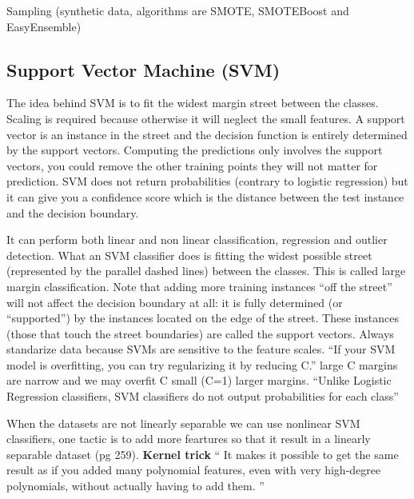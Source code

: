 \documentclass[11pt]{article}
\begin{document}
Sampling (synthetic data, algorithms are SMOTE, SMOTEBoost and EasyEnsemble)



\subsection{Support Vector Machine (SVM)}
%

The idea behind SVM is to fit the widest margin street between the classes. Scaling is required because otherwise it will neglect the small features.
A support vector is an instance in the street and the decision function is entirely determined by the support vectors. Computing the predictions only involves the support vectors, you could remove the other training points they will not matter for prediction.
SVM does not return probabilities (contrary to logistic regression) but it can give you a confidence score which is the distance between the test instance and the decision boundary.



It can perform both linear and non linear classification, regression and outlier detection. What an SVM classifier does is fitting the widest possible street (represented by the parallel dashed lines) between the classes. This is called large margin classification.
Note that adding more training instances “off the street” will not affect the decision boundary at all: it is fully determined (or “supported”) by the instances located on the edge of the street. These instances (those that touch the street boundaries) are called the support vectors. Always standarize data because SVMs are sensitive to the feature scales.
“If your SVM model is overfitting, you can try regularizing it by reducing C.” large C margins are narrow and we may overfit C small (C=1) larger margins. “Unlike Logistic Regression classifiers, SVM classifiers do not output probabilities for each class”


When the datasets are not linearly separable we can use nonlinear SVM classifiers, one tactic is to add more feartures so that it result in a linearly separable dataset (pg 259).
\textbf{Kernel trick} “ It makes it possible to get the same result as if you added many polynomial features, even with very high-degree polynomials, without actually having to add them. ”
\end{document}
